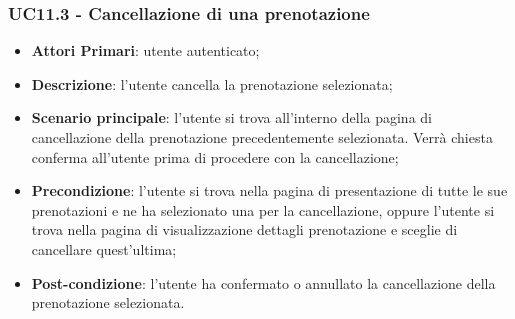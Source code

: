 \subsubsection{UC11.3 - Cancellazione di una prenotazione}
\begin{itemize}
	\item \textbf{Attori Primari}: utente autenticato;
	\item \textbf{Descrizione}: l'utente cancella la prenotazione selezionata;
	\item \textbf{Scenario principale}: l'utente si trova all'interno della pagina di cancellazione della prenotazione precedentemente selezionata. Verrà chiesta conferma all'utente prima di procedere con la cancellazione;
	\item \textbf{Precondizione}: l'utente si trova nella pagina di presentazione di tutte le sue prenotazioni e ne ha selezionato una per la cancellazione, oppure l'utente si trova nella pagina di visualizzazione dettagli prenotazione e sceglie di cancellare quest'ultima;
	\item \textbf{Post-condizione}: l'utente ha confermato o annullato la cancellazione della prenotazione selezionata.
\end{itemize}
